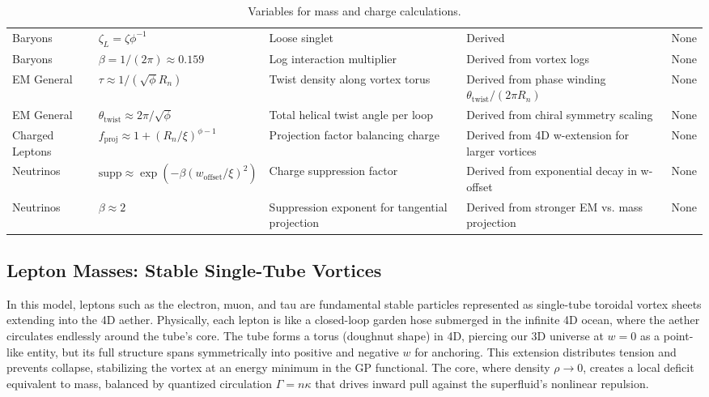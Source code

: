 \documentclass{article}
\begin{document}
\begin{sidewaystable}[p]
\begin{tabular}{|p{2cm}|p{3cm}|p{6cm}|p{6cm}|p{3cm}|}
Baryons & $\zeta_L = \zeta \phi^{-1}$ & Loose singlet & Derived & None \\
Baryons & $\beta = 1/(2\pi) \approx 0.159$ & Log interaction multiplier & Derived from vortex logs & None \\
EM General & $\tau \approx 1 / (\sqrt{\phi} R_n)$ & Twist density along vortex torus & Derived from phase winding $\theta_{\text{twist}} / (2\pi R_n)$ & None \\
EM General & $\theta_{\text{twist}} \approx 2\pi / \sqrt{\phi}$ & Total helical twist angle per loop & Derived from chiral symmetry scaling & None \\
Charged Leptons & $f_{\text{proj}} \approx 1 + (R_n / \xi)^{\phi - 1}$ & Projection factor balancing charge & Derived from 4D w-extension for larger vortices & None \\
Neutrinos & $\text{supp} \approx \exp( - \beta (w_{\text{offset}} / \xi)^2 )$ & Charge suppression factor & Derived from exponential decay in w-offset & None \\
Neutrinos & $\beta \approx 2$ & Suppression exponent for tangential projection & Derived from stronger EM vs. mass projection & None \\
\hline
\end{tabular}
\caption{Variables for mass and charge calculations.}
\label{tab:variables}
\end{sidewaystable}

\subsection{Lepton Masses: Stable Single-Tube Vortices}

In this model, leptons such as the electron, muon, and tau are fundamental stable particles represented as single-tube toroidal vortex sheets extending into the 4D aether. Physically, each lepton is like a closed-loop garden hose submerged in the infinite 4D ocean, where the aether circulates endlessly around the tube's core. The tube forms a torus (doughnut shape) in 4D, piercing our 3D universe at $w=0$ as a point-like entity, but its full structure spans symmetrically into positive and negative $w$ for anchoring. This extension distributes tension and prevents collapse, stabilizing the vortex at an energy minimum in the GP functional. The core, where density $\rho \to 0$, creates a local deficit equivalent to mass, balanced by quantized circulation $\Gamma = n \kappa$ that drives inward pull against the superfluid's nonlinear repulsion.
\end{document}
